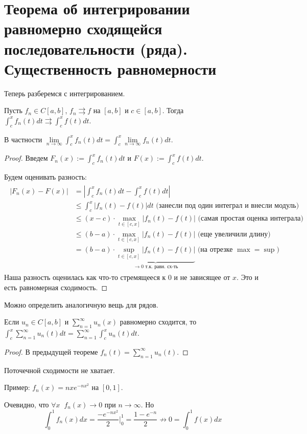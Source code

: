 \section{Теорема об интегрировании равномерно сходящейся последовательности (ряда). Существенность равномерности}
Теперь разберемся с интегрированием.

\begin{theorem}
    Пусть $f_n \in C[a, b]$, $f_n \rightrightarrows f$ на $[a, b]$ и $c \in [a, b]$. 
    Тогда $\int_c^x f_n(t)dt \rightrightarrows \int_c^x f(t)dt$.

    В частности $\lim\limits_{n \to \infty} \int_c^x f_n(t)dt = \int_c^x \lim\limits_{n \to \infty} f_n(t)dt$.
\end{theorem}

\begin{proof}
    Введем $F_n(x) := \int_c^x f_n(t)dt$ и $F(x) := \int_c^x f(t)dt $. 
    
    \quad Будем оценивать разность:
    \begin{gather*}
        \begin{split}
            |F_n(x) - F(x)| &= \left|\int_c^x f_n(t)dt - \int_c^x f(t)dt \right| \\
            &\leqslant \int_c^x |f_n(t) - f(t)|dt \text{ (занесли под один интеграл и внесли модуль) } \\
            &\leqslant (x - c) \cdot \max_{t \in [c, x]} |f_n(t) - f(t)| \text{ (самая простая оценка интеграла) } \\
            &\leqslant (b - a) \cdot \max_{t \in [c, x]} |f_n(t) - f(t)| \text{ (еще увеличили длину) }\\
            &= (b - a) \cdot \underbrace{\sup_{t \in [c, x]} |f_n(t) - f(t)|}_{\to 0 \text{ т.к. равн. сх-ть}} \text{ (на отрезке $\max = \sup$) }
        \end{split}
    \end{gather*}
    Наша разность оценилась как что-то стремящееся к 0 и не зависящее от $x$. Это и есть равномерная сходимость.
\end{proof}

\vspace*{7mm}

Можно определить аналогичную вещь для рядов.

\begin{follow}
    Если $u_n \in C[a, b]$ и $\sum\limits_{n=1}^\infty u_n(x)$ равномерно сходится, то $\int_c^x \sum\limits_{n=1}^\infty u_n(t) dt = \sum\limits_{n=1}^\infty \int_c^x u_n(t) dt$.
\end{follow}
\begin{proof}
    В предыдущей теореме $f_n(t) = \sum\limits_{n=1}^\infty u_n(t)$.
\end{proof}

\begin{notice}
    Поточечной сходимости не хватает.
    
    \quad Пример: $f_n(x) = nxe^{-nx^2}$ на $[0, 1]$.

    \quad Очевидно, что $\forall x \;\; f_n(x) \to 0$ при $n \to \infty$. Но \[ \int_0^1 f_n(x)dx = \frac{-e^{-nx^2}}{2}\Big|_0^1 = \frac{1 - e^{-n}}{2} \nrightarrow 0 = \int_0^1 f(x)dx \]
\end{notice}

